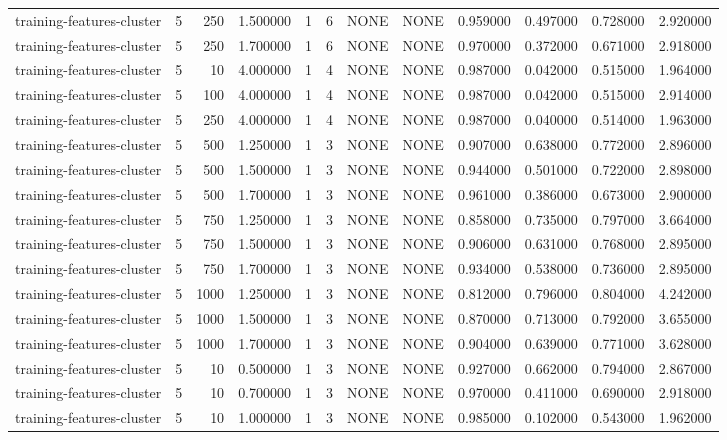 \begin{tabular}{lrrrllllrrrr}
training-features-cluster & 5 & 250 & 1.500000 & 1 & 6 & NONE & NONE & 0.959000 & 0.497000 & 0.728000 & 2.920000 \\
training-features-cluster & 5 & 250 & 1.700000 & 1 & 6 & NONE & NONE & 0.970000 & 0.372000 & 0.671000 & 2.918000 \\
training-features-cluster & 5 & 10 & 4.000000 & 1 & 4 & NONE & NONE & 0.987000 & 0.042000 & 0.515000 & 1.964000 \\
training-features-cluster & 5 & 100 & 4.000000 & 1 & 4 & NONE & NONE & 0.987000 & 0.042000 & 0.515000 & 2.914000 \\
training-features-cluster & 5 & 250 & 4.000000 & 1 & 4 & NONE & NONE & 0.987000 & 0.040000 & 0.514000 & 1.963000 \\
training-features-cluster & 5 & 500 & 1.250000 & 1 & 3 & NONE & NONE & 0.907000 & 0.638000 & 0.772000 & 2.896000 \\
training-features-cluster & 5 & 500 & 1.500000 & 1 & 3 & NONE & NONE & 0.944000 & 0.501000 & 0.722000 & 2.898000 \\
training-features-cluster & 5 & 500 & 1.700000 & 1 & 3 & NONE & NONE & 0.961000 & 0.386000 & 0.673000 & 2.900000 \\
training-features-cluster & 5 & 750 & 1.250000 & 1 & 3 & NONE & NONE & 0.858000 & 0.735000 & 0.797000 & 3.664000 \\
training-features-cluster & 5 & 750 & 1.500000 & 1 & 3 & NONE & NONE & 0.906000 & 0.631000 & 0.768000 & 2.895000 \\
training-features-cluster & 5 & 750 & 1.700000 & 1 & 3 & NONE & NONE & 0.934000 & 0.538000 & 0.736000 & 2.895000 \\
training-features-cluster & 5 & 1000 & 1.250000 & 1 & 3 & NONE & NONE & 0.812000 & 0.796000 & 0.804000 & 4.242000 \\
training-features-cluster & 5 & 1000 & 1.500000 & 1 & 3 & NONE & NONE & 0.870000 & 0.713000 & 0.792000 & 3.655000 \\
training-features-cluster & 5 & 1000 & 1.700000 & 1 & 3 & NONE & NONE & 0.904000 & 0.639000 & 0.771000 & 3.628000 \\
training-features-cluster & 5 & 10 & 0.500000 & 1 & 3 & NONE & NONE & 0.927000 & 0.662000 & 0.794000 & 2.867000 \\
training-features-cluster & 5 & 10 & 0.700000 & 1 & 3 & NONE & NONE & 0.970000 & 0.411000 & 0.690000 & 2.918000 \\
training-features-cluster & 5 & 10 & 1.000000 & 1 & 3 & NONE & NONE & 0.985000 & 0.102000 & 0.543000 & 1.962000 \\

\end{tabular}
